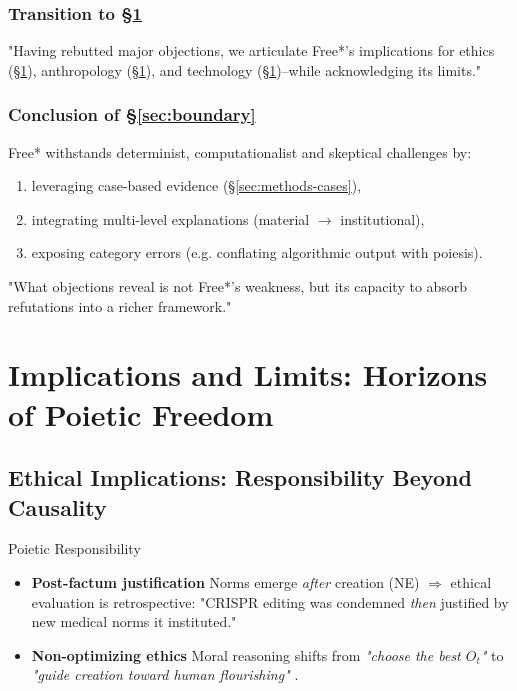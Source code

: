 \documentclass[11pt,a4paper]{article}
\begin{document}
\subsubsection{Transition to \S\ref{sec:implications}}

"Having rebutted major objections, we articulate Free*'s implications for ethics (\S\ref{sec:implications}), anthropology (\S\ref{sec:implications}), and technology (\S\ref{sec:implications})--while acknowledging its limits."

\subsubsection{Conclusion of \S\ref{sec:boundary}}

Free* withstands determinist, computationalist and skeptical challenges by:

\begin{enumerate}
  \item leveraging case-based evidence (\S\ref{sec:methods-cases}),
  \item integrating multi-level explanations (material \(\to\) institutional),
  \item exposing category errors (e.g. conflating algorithmic output with poiesis).
\end{enumerate}

"What objections reveal is not Free*'s weakness, but its capacity to absorb refutations into a richer framework." \cite[ p. 155]{shapiro2024}

\section{Implications and Limits: Horizons of Poietic Freedom}\label{sec:implications}

\subsection{Ethical Implications: Responsibility Beyond Causality}\label{sec:implications-ethics}

Poietic Responsibility

\begin{itemize}
  \item \textbf{Post-factum justification} Norms emerge \emph{after} creation (NE) \(\Rightarrow\) ethical evaluation is retrospective: "CRISPR editing was condemned \emph{then} justified by new medical norms it instituted." \cite[ p. 132]{floridi2024}
  \item \textbf{Non-optimizing ethics} Moral reasoning shifts from \emph{"choose the best \(O_{t}\)"} to \emph{"guide creation toward human flourishing"} \cite{nguyen2024}.
\end{itemize}
\end{document}
